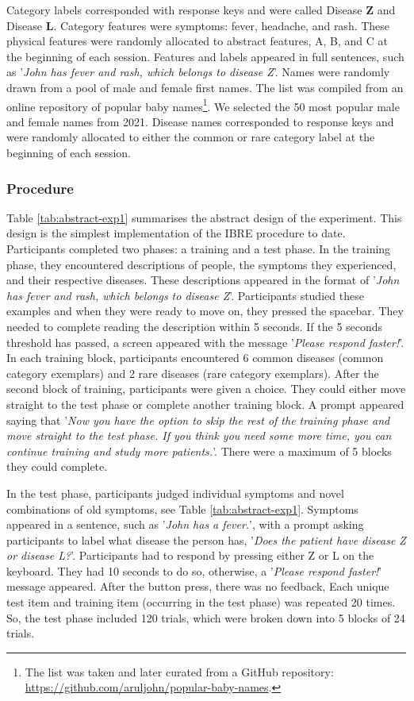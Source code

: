 \documentclass[10pt,letterpaper]{article}
\begin{document}
Category labels corresponded with response keys and were called Disease \textbf{Z} and Disease \textbf{L}.
Category features were symptoms: fever, headache, and rash.
These physical features were randomly allocated to abstract features, A, B, and C at the beginning of each session.
Features and labels appeared in full sentences, such as '\textit{John has fever and rash, which belongs to disease Z}'.
Names were randomly drawn from a pool of male and female first names.
The list was compiled from an online repository of popular baby names\footnote{The list was taken and later curated from a GitHub repository: \href{https://github.com/aruljohn/popular-baby-names}{https://github.com/aruljohn/popular-baby-names}.}.
We selected the 50 most popular male and female names from 2021.
Disease names corresponded to response keys and were randomly allocated to either the common or rare category label at the beginning of each session.

\subsubsection{Procedure}

Table \ref{tab:abstract-exp1} summarises the abstract design of the experiment.
This design is the simplest implementation of the IBRE procedure to date.
Participants completed two phases: a training and a test phase.
In the training phase, they encountered descriptions of people, the symptoms they experienced, and their respective diseases.
These descriptions appeared in the format of '\textit{John has fever and rash, which belongs to disease Z}'.
Participants studied these examples and when they were ready to move on, they pressed the spacebar.
They needed to complete reading the description within 5 seconds.
If the 5 seconds threshold has passed, a screen appeared with the message '\textit{Please respond faster!}'.
In each training block, participants encountered 6 common diseases (common category exemplars) and 2 rare diseases (rare category exemplars).
After the second block of training, participants were given a choice.
They could either move straight to the test phase or complete another training block.
A prompt appeared saying that '\textit{Now you have the option to skip the rest of the training phase and move straight to the test phase. If you think you need some more time, you can continue training and study more patients.}'.
There were a maximum of 5 blocks they could complete.

In the test phase, participants judged individual symptoms and novel combinations of old symptoms, see Table \ref*{tab:abstract-exp1}.
Symptoms appeared in a sentence, such as '\textit{John has a fever.}', with a prompt asking participants to label what disease the person has, '\textit{Does the patient have disease Z or disease L?}'.
Participants had to respond by pressing either Z or L on the keyboard.
They had 10 seconds to do so, otherwise, a '\textit{Please respond faster!}' message appeared.
After the button press, there was no feedback,
Each unique test item and training item (occurring in the test phase) was repeated 20 times.
So, the test phase included 120 trials, which were broken down into 5 blocks of 24 trials.
\end{document}
